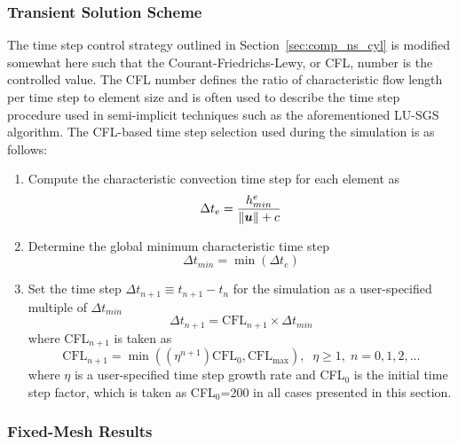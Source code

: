 \subsubsection{Transient Solution Scheme}
The time step control strategy outlined in Section~\ref{sec:comp_ns_cyl} is modified somewhat here such that the Courant-Friedrichs-Lewy, or CFL, number is the controlled value.  The CFL number defines the ratio of characteristic flow length per time step to element size and is often used to describe the time step procedure used in semi-implicit techniques such as the aforementioned LU-SGS algorithm.  The CFL-based time step selection used during the simulation is as follows:
\begin{enumerate}
  \tightlist
  \item Compute the characteristic convection time step for each element as
    \begin{equation*}
      \Delta t_e = \frac{h^e_{min}}{\|{\boldsymbol{u}}\| + c}
    \end{equation*}
  \item Determine the global minimum characteristic time step
    \begin{equation*}
      \Delta t_{min} = \min(\Delta t_e)
    \end{equation*}
  \item Set the time step $\Delta t_{n+1} \equiv t_{n+1}-t_n$ for the simulation as a user-specified multiple of $\Delta t_{min}$
    \begin{equation}
      \Delta t_{n+1} = \mbox{CFL}_{n+1}\times \Delta t_{min}
    \end{equation}
    where CFL$_{n+1}$ is taken as
    \begin{equation}
      \mbox{CFL}_{n+1} = \min\left(\left(\eta^{n+1}\right)\mbox{CFL}_0, \mbox{CFL}_{\max}\right),\;\; \eta \ge 1,\; n=0,1,2,\ldots
      \label{eq:CFL_np1}
    \end{equation}
    where $\eta$ is a user-specified time step growth rate and CFL$_0$ is the initial time step factor, which is taken as CFL$_0$=200 in all cases presented in this section.
\end{enumerate}


\subsubsection{Fixed-Mesh Results}

